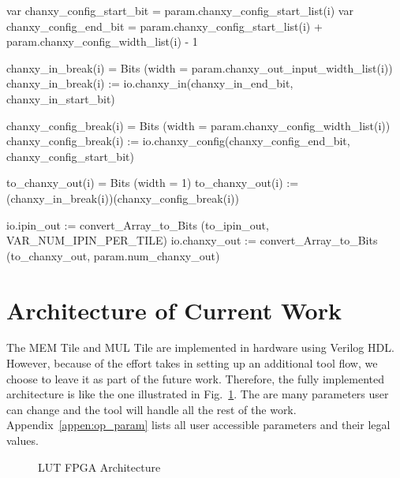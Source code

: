 \begin{scala}
{{{          var chanxy_config_start_bit = param.chanxy_config_start_list(i)                                        
          var chanxy_config_end_bit = param.chanxy_config_start_list(i) + param.chanxy_config_width_list(i) - 1  
                                                                                                                 
          chanxy_in_break(i) = Bits (width = param.chanxy_out_input_width_list(i))                               
          chanxy_in_break(i) := io.chanxy_in(chanxy_in_end_bit, chanxy_in_start_bit)                             
                                                                                                                 
          chanxy_config_break(i) = Bits (width = param.chanxy_config_width_list(i))                              
          chanxy_config_break(i) := io.chanxy_config(chanxy_config_end_bit, chanxy_config_start_bit)             
                                                                                                                 
          to_chanxy_out(i) = Bits (width = 1)                                                                    
          to_chanxy_out(i) := (chanxy_in_break(i))(chanxy_config_break(i))                                       
      }                                                                                                          
  }                                                                                                              
                                                                                                                 
  io.ipin_out := convert_Array_to_Bits (to_ipin_out, VAR_NUM_IPIN_PER_TILE)                                      
  io.chanxy_out := convert_Array_to_Bits (to_chanxy_out, param.num_chanxy_out)                                   
}                                                                                                                
\end{scala}

\section{Architecture of Current Work}
\label{sec:lut_fpga_arch}
The MEM Tile and MUL Tile are implemented in hardware using Verilog HDL. However, because of the effort takes
in setting up an additional tool flow, we choose to leave it as part of the future work. Therefore, the fully implemented
architecture is like the one illustrated in Fig.~\ref{fig:fpga_lut_arch}. The are many parameters user can change and the
tool will handle all the rest of the work. Appendix~\ref{appen:op_param} lists all user accessible parameters and their
legal values. \par

\begin{figure}[htp]
	\begin{center}
		\epsfxsize=4in 
		    \renewcommand{\captionfont}{\small}
				\caption{LUT FPGA Architecture
				\label{fig:fpga_lut_arch}}
	\end{center}
\end{figure}
